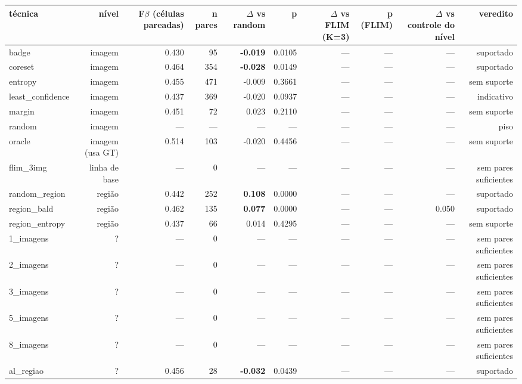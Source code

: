 \begin{tabular}{lrrrrrrrrr}
\hline
técnica & nível & F$\beta$ (células pareadas) & n pares & $\Delta$ vs random & p & $\Delta$ vs FLIM (K=3) & p (FLIM) & $\Delta$ vs controle do nível & veredito \\
\hline
badge & imagem & 0.430 & 95 & \textbf{-0.019} & 0.0105 & --- & --- & --- & suportado \\
coreset & imagem & 0.464 & 354 & \textbf{-0.028} & 0.0149 & --- & --- & --- & suportado \\
entropy & imagem & 0.455 & 471 & -0.009 & 0.3661 & --- & --- & --- & sem suporte \\
least\_confidence & imagem & 0.437 & 369 & -0.020 & 0.0937 & --- & --- & --- & indicativo \\
margin & imagem & 0.451 & 72 & 0.023 & 0.2110 & --- & --- & --- & sem suporte \\
random & imagem & --- & --- & --- & --- & --- & --- & --- & piso \\
oracle & imagem (usa GT) & 0.514 & 103 & -0.020 & 0.4456 & --- & --- & --- & sem suporte \\
flim\_3img & linha de base & --- & 0 & --- & --- & --- & --- & --- & sem pares suficientes \\
random\_region & região & 0.442 & 252 & \textbf{0.108} & 0.0000 & --- & --- & --- & suportado \\
region\_bald & região & 0.462 & 135 & \textbf{0.077} & 0.0000 & --- & --- & 0.050 & suportado \\
region\_entropy & região & 0.437 & 66 & 0.014 & 0.4295 & --- & --- & --- & sem suporte \\
1\_imagens & ? & --- & 0 & --- & --- & --- & --- & --- & sem pares suficientes \\
2\_imagens & ? & --- & 0 & --- & --- & --- & --- & --- & sem pares suficientes \\
3\_imagens & ? & --- & 0 & --- & --- & --- & --- & --- & sem pares suficientes \\
5\_imagens & ? & --- & 0 & --- & --- & --- & --- & --- & sem pares suficientes \\
8\_imagens & ? & --- & 0 & --- & --- & --- & --- & --- & sem pares suficientes \\
al\_regiao & ? & 0.456 & 28 & \textbf{-0.032} & 0.0439 & --- & --- & --- & suportado \\

\end{tabular}
